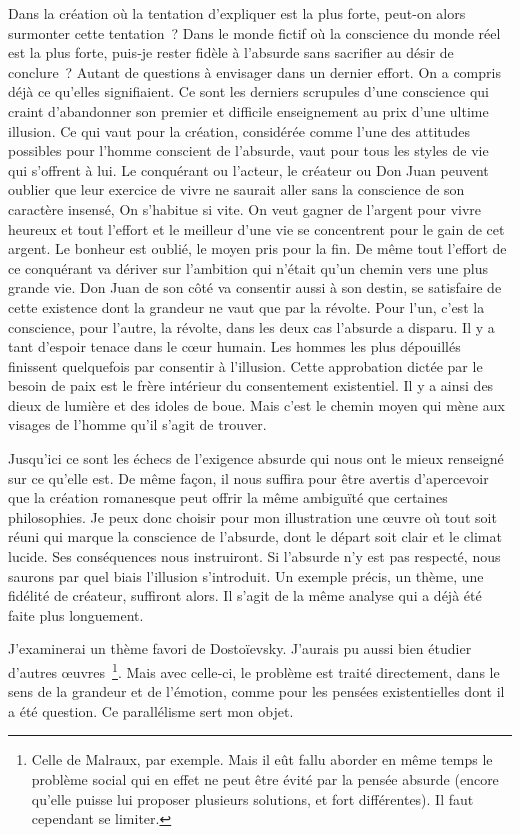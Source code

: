 \documentclass{book}
\begin{document}
Dans la création où la tentation d'expliquer est la plus forte, peut-on alors surmonter cette tentation ? Dans le monde fictif où la conscience du monde réel est la plus forte, puis‑je rester fidèle à l'absurde sans sacrifier au désir de conclure ? Autant de questions à envisager dans un dernier effort. On a compris déjà ce qu'elles signifiaient. Ce sont les derniers scrupules d'une conscience qui craint d'abandonner son premier et difficile enseignement au prix d'une ultime illusion. Ce qui vaut pour la création, considérée comme l'une des attitudes possibles pour l'homme conscient de l'absurde, vaut pour tous les styles de vie qui s'offrent à lui. Le conquérant ou l’acteur, le créateur ou Don Juan peuvent oublier que leur exercice de vivre ne saurait aller sans la conscience de son caractère insensé, On s'habitue si vite. On veut gagner de l'argent pour vivre heureux et tout l'effort et le meilleur d'une vie se concentrent pour le gain de cet argent. Le bonheur est oublié, le moyen pris pour la fin. De même tout l'effort de ce conquérant va dériver sur l'ambition qui n'était qu'un chemin vers une plus grande vie. Don Juan de son côté va consentir aussi à son destin, se satisfaire de cette existence dont la grandeur ne vaut que par la révolte. Pour l'un, c'est la conscience, pour l'autre, la révolte, dans les deux cas l'absurde a disparu. Il y a tant d'espoir tenace dans le cœur humain. Les hommes les plus dépouillés finissent quelquefois par consentir à l'illusion. Cette approbation dictée par le besoin de paix est le frère intérieur du consentement existentiel. Il y a ainsi des dieux de lumière et des idoles de boue. Mais c'est le chemin moyen qui mène aux visages de l'homme qu'il s'agit de trouver.

Jusqu'ici ce sont les échecs de l'exigence absurde qui nous ont le mieux renseigné sur ce qu'elle est. De même façon, il nous suffira pour être avertis d'apercevoir que la création romanesque peut offrir la même ambiguïté que certaines philosophies. Je peux donc choisir pour mon illustration une œuvre où tout soit réuni qui marque la conscience de l'absurde, dont le départ soit clair et le climat lucide. Ses conséquences nous instruiront. Si l'absurde n’y est pas respecté, nous saurons par quel biais l'illusion s'introduit. Un exemple précis, un thème, une fidélité de créateur, suffiront alors. Il s'agit de la même analyse qui a déjà été faite plus longuement.

J'examinerai un thème favori de Dostoïevsky. J'aurais pu aussi bien étudier d'autres œuvres \footnote{Celle de Malraux, par exemple. Mais il eût fallu aborder en même temps le problème social qui en effet ne peut être évité par la pensée absurde (encore qu'elle puisse lui proposer plusieurs solutions, et fort différentes). Il faut cependant se limiter.}. Mais avec celle‑ci, le problème est traité directement, dans le sens de la grandeur et de l'émotion, comme pour les pensées existentielles dont il a été question. Ce parallélisme sert mon objet.
\end{document}
